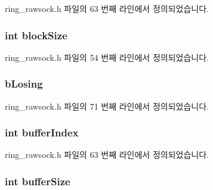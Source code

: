 ring\+\_\+rawsock.\+h 파일의 63 번째 라인에서 정의되었습니다.

\subsubsection[{\texorpdfstring{block\+Size}{blockSize}}]{\setlength{\rightskip}{0pt plus 5cm}int block\+Size}\hypertarget{structring__rawsock__t_a4aaa73e329d20f35039fa5cdd2e6f648}{}\label{structring__rawsock__t_a4aaa73e329d20f35039fa5cdd2e6f648}


ring\+\_\+rawsock.\+h 파일의 54 번째 라인에서 정의되었습니다.

\subsubsection[{\texorpdfstring{b\+Losing}{bLosing}}]{ b\+Losing}\hypertarget{structring__rawsock__t_a1b1908d367566395a95aac1d61367585}{}\label{structring__rawsock__t_a1b1908d367566395a95aac1d61367585}


ring\+\_\+rawsock.\+h 파일의 71 번째 라인에서 정의되었습니다.

\subsubsection[{\texorpdfstring{buffer\+Index}{bufferIndex}}]{\setlength{\rightskip}{0pt plus 5cm}int buffer\+Index}\hypertarget{structring__rawsock__t_a73b963945a418c57630c1b66ce2aa74f}{}\label{structring__rawsock__t_a73b963945a418c57630c1b66ce2aa74f}


ring\+\_\+rawsock.\+h 파일의 63 번째 라인에서 정의되었습니다.

\subsubsection[{\texorpdfstring{buffer\+Size}{bufferSize}}]{\setlength{\rightskip}{0pt plus 5cm}int buffer\+Size}\hypertarget{structring__rawsock__t_a8556d19b129aa550f5b2819ed0320e83}{}\label{structring__rawsock__t_a8556d19b129aa550f5b2819ed0320e83}


